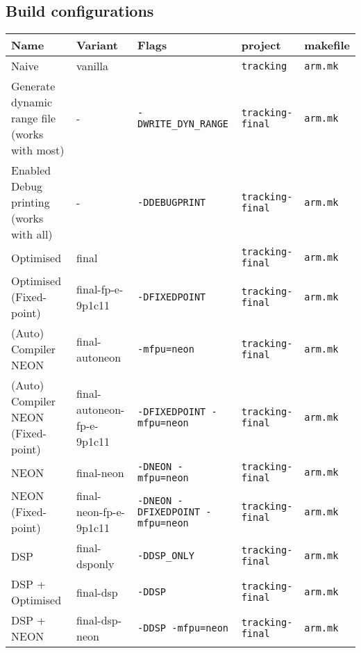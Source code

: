 \documentclass[final]{article} %
\begin{document}
\begin{appendices}
\section{Build configurations}
\begin{table}[H]
	\centering
	\begin{tabular}{>{\raggedright}p{2.5cm}l>{\raggedright}p{3cm}ll}
	\toprule
	\textbf{Name}								& \textbf{Variant}				& \textbf{Flags}							& \textbf{project}			& \textbf{makefile}	\\
	\midrule
	Naive										& vanilla 						& \texttt{}									& \texttt{tracking}			& \texttt{arm.mk}	\\
	Generate dynamic range file	(works with most)& - 							& \texttt{-DWRITE\_DYN\_RANGE}				& \texttt{tracking-final}	& \texttt{arm.mk}	\\
	Enabled Debug printing	(works with all)    & - 							& \texttt{-DDEBUGPRINT}						& \texttt{tracking-final}	& \texttt{arm.mk}	\\
	Optimised									& final 						& \texttt{}									& \texttt{tracking-final}	& \texttt{arm.mk}	\\
	Optimised (Fixed-point)						& final-fp-e-9p1c11				& \texttt{-DFIXEDPOINT}	    				& \texttt{tracking-final}	& \texttt{arm.mk}	\\
	(Auto) Compiler NEON						& final-autoneon 				& \texttt{-mfpu=neon}		    			& \texttt{tracking-final}	& \texttt{arm.mk}	\\
	(Auto) Compiler NEON (Fixed-point)			& final-autoneon-fp-e-9p1c11	& \texttt{-DFIXEDPOINT -mfpu=neon}		    & \texttt{tracking-final}	& \texttt{arm.mk}	\\
	NEON										& final-neon 					& \texttt{-DNEON -mfpu=neon}		    	& \texttt{tracking-final}	& \texttt{arm.mk}	\\
	NEON (Fixed-point)							& final-neon-fp-e-9p1c11		& \texttt{-DNEON -DFIXEDPOINT -mfpu=neon}	& \texttt{tracking-final}	& \texttt{arm.mk}	\\
	DSP											& final-dsponly					& \texttt{-DDSP\_ONLY}						& \texttt{tracking-final}	& \texttt{arm.mk}	\\
	DSP + Optimised								& final-dsp 					& \texttt{-DDSP}							& \texttt{tracking-final}	& \texttt{arm.mk}	\\
	DSP + NEON									& final-dsp-neon 				& \texttt{-DDSP -mfpu=neon}					& \texttt{tracking-final}	& \texttt{arm.mk}	\\
	\bottomrule
	\end{tabular}
\end{table}


\end{appendices}
\end{document}
